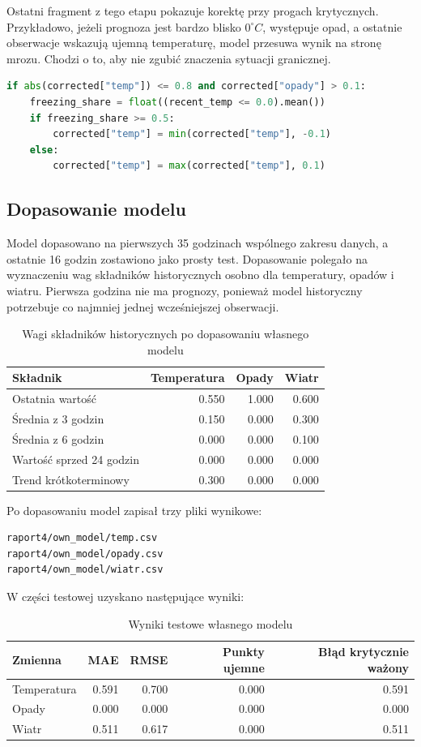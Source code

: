 \documentclass[a4paper,12pt]{article}
\begin{document}
Ostatni fragment z tego etapu pokazuje korektę przy progach krytycznych.
Przykładowo, jeżeli prognoza jest bardzo blisko \(0^\circ C\), występuje opad,
a ostatnie obserwacje wskazują ujemną temperaturę, model przesuwa wynik na
stronę mrozu. Chodzi o to, aby nie zgubić znaczenia sytuacji granicznej.

\begin{lstlisting}[language=Python]
if abs(corrected["temp"]) <= 0.8 and corrected["opady"] > 0.1:
    freezing_share = float((recent_temp <= 0.0).mean())
    if freezing_share >= 0.5:
        corrected["temp"] = min(corrected["temp"], -0.1)
    else:
        corrected["temp"] = max(corrected["temp"], 0.1)
\end{lstlisting}

\subsection{Dopasowanie modelu}

Model dopasowano na pierwszych 35 godzinach wspólnego zakresu danych, a
ostatnie 16 godzin zostawiono jako prosty test. Dopasowanie polegało na
wyznaczeniu wag składników historycznych osobno dla temperatury, opadów i
wiatru. Pierwsza godzina nie ma prognozy, ponieważ model historyczny potrzebuje
co najmniej jednej wcześniejszej obserwacji.

\begin{table}[h]
\centering
\caption{Wagi składników historycznych po dopasowaniu własnego modelu}
\begin{tabular}{lrrr}
\toprule
Składnik & Temperatura & Opady & Wiatr \\
\midrule
Ostatnia wartość & 0.550 & 1.000 & 0.600 \\
Średnia z 3 godzin & 0.150 & 0.000 & 0.300 \\
Średnia z 6 godzin & 0.000 & 0.000 & 0.100 \\
Wartość sprzed 24 godzin & 0.000 & 0.000 & 0.000 \\
Trend krótkoterminowy & 0.300 & 0.000 & 0.000 \\
\bottomrule
\end{tabular}
\end{table}

Po dopasowaniu model zapisał trzy pliki wynikowe:
\begin{verbatim}
raport4/own_model/temp.csv
raport4/own_model/opady.csv
raport4/own_model/wiatr.csv
\end{verbatim}

W części testowej uzyskano następujące wyniki:
\begin{table}[h]
\centering
\caption{Wyniki testowe własnego modelu}
\begin{tabular}{lrrrr}
\toprule
Zmienna & MAE & RMSE & Punkty ujemne & Błąd krytycznie ważony \\
\midrule
Temperatura & 0.591 & 0.700 & 0.000 & 0.591 \\
Opady & 0.000 & 0.000 & 0.000 & 0.000 \\
Wiatr & 0.511 & 0.617 & 0.000 & 0.511 \\
\bottomrule
\end{tabular}
\end{table}
\end{document}

